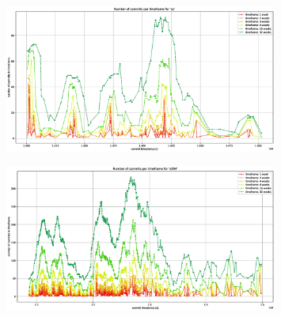 \begin{figure}
	\centering
	\includegraphics[width=0.8\textwidth]{images/activity_xz.eps}
\end{figure}

\begin{figure}
	\centering
	\includegraphics[width=0.8\textwidth]{images/activity_x264.eps}
\end{figure}